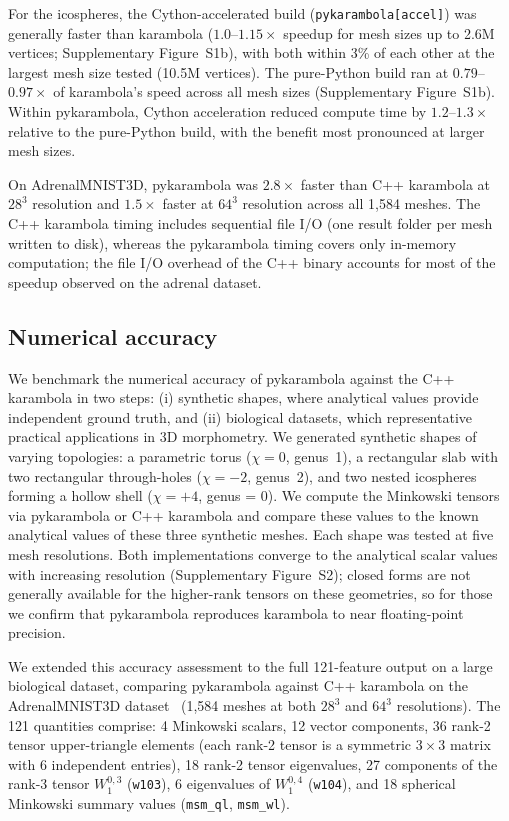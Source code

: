 \documentclass[unnumsec,webpdf,contemporary,large,namedate]{oup-authoring-template}
\begin{document}
For the icospheres, the Cython-accelerated build (\texttt{pykarambola[\allowbreak accel]}) was
generally faster than karambola ($1.0$--$1.15\times$ speedup for mesh sizes
up to 2.6M vertices; Supplementary Figure~S1b), with both within 3\% of
each other at the largest mesh size tested (10.5M vertices).
The pure-Python build ran at $0.79$--$0.97\times$ of karambola's speed
across all mesh sizes (Supplementary Figure~S1b).
Within pykarambola, Cython acceleration reduced compute time by
$1.2$--$1.3\times$ relative to the pure-Python build, with the benefit most
pronounced at larger mesh sizes.

On AdrenalMNIST3D, pykarambola was $2.8\times$ faster than C++
karambola at $28^3$ resolution and $1.5\times$ faster at $64^3$
resolution across all 1{,}584 meshes.
The C++ karambola timing includes sequential file I/O (one result folder
per mesh written to disk), whereas the pykarambola timing covers only
in-memory computation; the file I/O overhead of the C++ binary accounts for most
of the speedup observed on the adrenal dataset.

\subsection{Numerical accuracy}

We benchmark the numerical accuracy of pykarambola against the C++ karambola in two steps: (i) synthetic shapes, where analytical values provide independent ground truth, and (ii) biological datasets, which representative practical applications in 3D morphometry.
We generated synthetic shapes of varying topologies: a parametric torus ($\chi = 0$, genus~1), a rectangular slab with two rectangular through-holes ($\chi = -2$, genus~2), and two nested icospheres forming a hollow shell ($\chi = +4$, genus = 0).
We compute the Minkowski tensors via pykarambola or C++ karambola and compare these values to the known analytical values of these three synthetic meshes.
Each shape was tested at five mesh resolutions.
Both implementations converge to the analytical scalar values with increasing resolution (Supplementary Figure~S2); closed forms are not generally available for the higher-rank tensors on these geometries, so for those we confirm that pykarambola reproduces karambola to near floating-point precision.

We extended this accuracy assessment to the full 121-feature output on a large biological dataset, comparing pykarambola against C++ karambola on the AdrenalMNIST3D 
dataset~\citep{Yang2023MedMNIST} (1{,}584 meshes at both $28^3$ and $64^3$
resolutions).
The 121 quantities comprise: 4 Minkowski scalars, 12 vector components, 36
rank-2 tensor upper-triangle elements (each rank-2 tensor is a symmetric
$3\times 3$ matrix with 6 independent entries), 18 rank-2 tensor eigenvalues, 27
components of the rank-3 tensor $W_1^{0,3}$ (\texttt{w103}), 6 eigenvalues of
$W_1^{0,4}$ (\texttt{w104}), and 18 spherical Minkowski summary values
(\texttt{msm\_ql}, \texttt{msm\_wl}).
\end{document}

